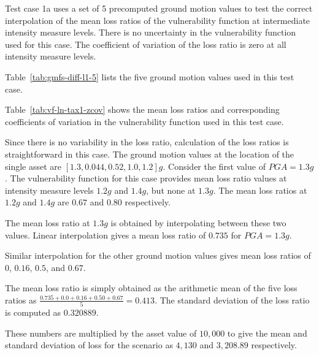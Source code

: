 Test case 1a uses a set of 5 precomputed ground motion values to test the correct interpolation of the mean loss ratios of the vulnerability function at intermediate intensity measure levels. There is no uncertainty in the vulnerability function used for this case. The coefficient of variation of the loss ratio is zero at all intensity measure levels.



Table~\ref{tab:gmfs-diff-l1-5} lists the five ground motion values used in this test case.



Table~\ref{tab:vf-ln-tax1-zcov} shows the mean loss ratios and corresponding coefficients of variation in the vulnerability function used in this test case.

Since there is no variability in the loss ratio, calculation of the loss ratios is straightforward in this case. The ground motion values at the location of the single asset are $[1.3, 0.044, 0.52, 1.0, 1.2] g$. Consider the first value of $PGA = 1.3 g$. The vulnerability function for this case provides mean loss ratio values at intensity measure levels $1.2 g$ and $1.4 g$, but none at $1.3 g$. The mean loss ratios at $1.2 g$ and $1.4 g$ are $0.67$ and $0.80$ respectively.

The mean loss ratio at $1.3 g$ is obtained by interpolating between these two values. Linear interpolation gives a mean loss ratio of $0.735$ for $PGA = 1.3 g$.

Similar interpolation for the other ground motion values gives mean loss ratios of $0$, $0.16$, $0.5$, and $0.67$.

The mean loss ratio is simply obtained as the arithmetic mean of the five loss ratios as $\frac{0.735 + 0.0 + 0.16 + 0.50 + 0.67}{5} = 0.413$. The standard deviation of the loss ratio is computed as $0.320889$.

These numbers are multiplied by the asset value of $10,000$ to give the mean and standard deviation of loss for the scenario as $4,130$ and $3,208.89$ respectively.